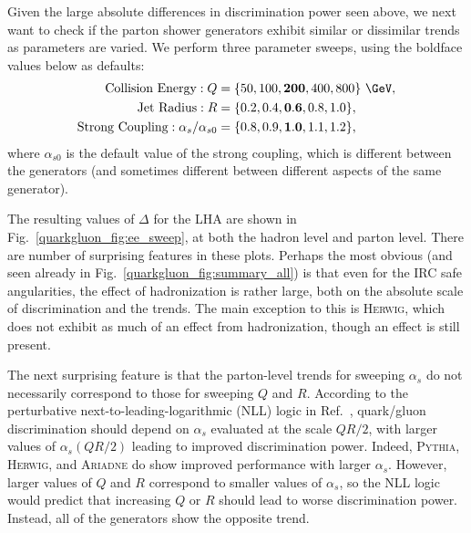 \documentclass[11pt]{cernrep}
\begin{document}
Given the large absolute differences in discrimination power seen above, we next want to check if the parton shower generators exhibit similar or dissimilar trends as parameters are varied.  We perform three parameter sweeps, using the boldface values below as defaults:
\begin{equation}
\begin{aligned}
\text{Collision Energy}: Q &= \{ 50, 100, \mathbf{200}, 400, 800\}~\GeV, \\
\text{Jet Radius}: R &= \{ 0.2, 0.4, \mathbf{0.6}, 0.8, 1.0\}, \\
\text{Strong Coupling}: \alpha_s / \alpha_{s0} &= \{0.8,0.9,\mathbf{1.0},1.1,1.2\}, \\
\end{aligned}
\end{equation}
where $\alpha_{s0}$ is the default value of the strong coupling, which is different between the generators (and sometimes different between different aspects of the same generator).

The resulting values of $\Delta$ for the LHA are shown in Fig.~\ref{quarkgluon_fig:ee_sweep}, at both the hadron level and parton level.   There are number of surprising features in these plots.  Perhaps the most obvious (and seen already in Fig.~\ref{quarkgluon_fig:summary_all}) is that even for the IRC safe angularities, the effect of hadronization is rather large, both on the absolute scale of discrimination and the trends.  The main exception to this is \textsc{Herwig}, which does not exhibit as much of an effect from hadronization, though an effect is still present.

The next surprising feature is that the parton-level trends for sweeping $\alpha_s$ do not necessarily correspond to those for sweeping $Q$ and $R$.  According to the perturbative next-to-leading-logarithmic (NLL) logic in Ref.~\cite{Larkoski:2013eya}, quark/gluon discrimination should depend on $\alpha_s$ evaluated at the scale $Q R / 2$, with larger values of $\alpha_s(Q R / 2)$ leading to improved discrimination power.  Indeed, \textsc{Pythia}, \textsc{Herwig}, and \textsc{Ariadne} do show improved performance with larger $\alpha_s$.  However, larger values of $Q$ and $R$ correspond to smaller values of $\alpha_s$, so the NLL logic would predict that increasing $Q$ or $R$ should lead to worse discrimination power.  Instead, all of the generators show the opposite trend.
\end{document}
